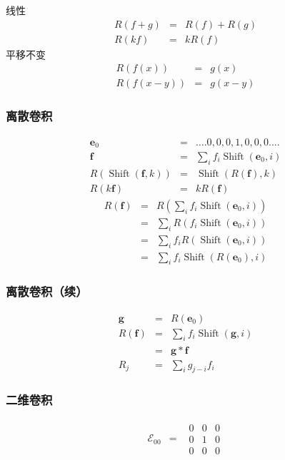\documentclass{beamer}
\newcommand{\nospace}{}
\newcommand{\tmmathbf}[1]{\ensuremath{\boldsymbol{#1}}}
\newcommand{\tmop}[1]{\ensuremath{\operatorname{#1}}}
\begin{document}
{{\begin{frame}
  线性
  \begin{eqnarray*}
    R (f + g) & = & R (f) + R (g)\\
    R (k \nospace f) & = & k \nospace R (f)
  \end{eqnarray*}
  平移不变
  \begin{eqnarray*}
    R (f (x)) & = & g (x)\\
    R (f (x - y)) & = & g (x - y)
  \end{eqnarray*}
\end{frame}}{\begin{frame}
  \frametitle{离散卷积}
  \begin{eqnarray*}
    \tmmathbf{e}_0 & = & \ldots .0, 0, 0, 1, 0, 0, 0 \ldots .\\
    \tmmathbf{f} & = & \sum_i f_i \tmop{Shift} (\tmmathbf{e}_0, i)\\
    R (\tmop{Shift} (\tmmathbf{f}, k)) & = & \tmop{Shift} (R (\tmmathbf{f}),
    k)\\
    R (k\tmmathbf{f}) & = & k \nospace R (\tmmathbf{f})
  \end{eqnarray*}
  \begin{eqnarray*}
    R (\tmmathbf{f}) & = & R \left( \sum_i f_i \tmop{Shift} (\tmmathbf{e}_0,
    i) \right)\\
    & = & \sum_i R (f_i \tmop{Shift} (\tmmathbf{e}_0, i))\\
    & = & \sum_i f_i R (\tmop{Shift} (\tmmathbf{e}_0, i))\\
    & = & \sum_i f_i \tmop{Shift} (R (\tmmathbf{e}_0), i)
  \end{eqnarray*}
\end{frame}}{\begin{frame}
  \frametitle{离散卷积（续）}
  \begin{eqnarray*}
    \tmmathbf{g} & = & R (\tmmathbf{e}_0)\\
    R (\tmmathbf{f}) & = & \sum_i f_i \tmop{Shift} (\tmmathbf{g}, i)\\
    & = & \tmmathbf{g} \ast \tmmathbf{f}\\
    R_j & = & \sum_i g_{j - i} f_i
  \end{eqnarray*}
\end{frame}}{\begin{frame}
  \frametitle{二维卷积}
  \begin{eqnarray*}
    \mathcal{E}_{00} & = & \begin{array}{lll}
      0 & 0 & 0\\
      0 & 1 & 0\\
      0 & 0 & 0

\end{array}
\end{eqnarray*}
\end{frame}}}
\end{document}
